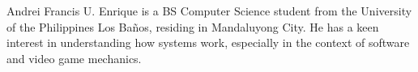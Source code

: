 \documentclass[journal]{./IEEE/IEEEtran}
\begin{document}
\begin{biography}{Andrei Francis U. Enrique}
is a BS Computer Science student from the University of the Philippines Los Baños, residing in Mandaluyong City. He has a keen interest in understanding how systems work, especially in the context of software and video game mechanics.
\end{biography}
\end{document}
